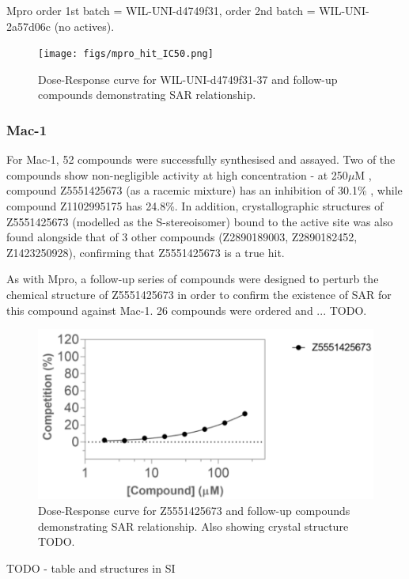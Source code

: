 \documentclass[journal=jacsat,manuscript=article]{achemso}
\newcommand{\uM}{$\mu$M }
\begin{document}
Mpro order 1st batch = WIL-UNI-d4749f31, order 2nd batch = WIL-UNI-2a57d06c (no actives). 

\begin{figure}
    \centering
    \texttt{[image: figs/mpro\_hit\_IC50.png]}
    \caption{Dose-Response curve for WIL-UNI-d4749f31-37 and follow-up compounds demonstrating SAR relationship.}
    \label{fig:mpro_hit}
\end{figure}

\subsubsection{Mac-1}
For Mac-1, 52 compounds were successfully synthesised and assayed. Two of the compounds show non-negligible activity at high concentration - at 250\uM, compound Z5551425673 (as a racemic mixture) has an inhibition of 30.1\% , while compound Z1102995175 has 24.8\%. In addition, crystallographic structures of Z5551425673 (modelled as the S-stereoisomer) bound to the active site was also found alongside that of 3 other compounds (Z2890189003, Z2890182452, Z1423250928), confirming that Z5551425673 is a true hit.

As with Mpro, a follow-up series of compounds were designed to perturb the chemical structure of Z5551425673 in order to confirm the existence of SAR for this compound against Mac-1. 26 compounds were ordered and ... TODO.

\begin{figure}
    \centering
    \includegraphics[width=\linewidth]{figs/mac1_hit_IC50.png}
    \caption{Dose-Response curve for Z5551425673 and follow-up compounds demonstrating SAR relationship. Also showing crystal structure TODO.}
    \label{fig:mac1_hit}
\end{figure}

TODO - table and structures in SI
\end{document}
